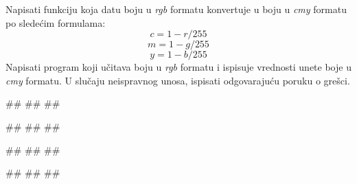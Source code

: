  
\begin{Exercise}[label=POK_02] 
  Napisati funkciju  koja datu boju u \textit{rgb} 
  formatu konvertuje u boju u \textit{cmy} formatu po sledećim formulama:\\
  $$c = 1 - r / 255$$
  $$m = 1 - g / 255$$
  $$y = 1 - b / 255$$
  Napisati program koji učitava boju u \textit{rgb} formatu i ispisuje vrednosti unete boje u \textit{cmy} formatu.
  U slučaju neispravnog unosa, ispisati odgovarajuću poruku o grešci. 
  \\

\begin{miditest}
\begin{upotreba}{1}
#\naslovInt#
##
##
\end{upotreba}
\end{miditest}
\begin{miditest}
\begin{upotreba}{2}
#\naslovInt#
##
##
\end{upotreba}
\end{miditest}

\begin{miditest}
\begin{upotreba}{3}
#\naslovInt#
##
##
\end{upotreba}
\end{miditest}
\begin{miditest}
\begin{upotreba}{4}
#\naslovInt#
##
##
\end{upotreba}
\end{miditest}

\end{Exercise}
\ifresenja
\begin{Answer}[ref=POK_02]
\end{Answer}
 \fi

